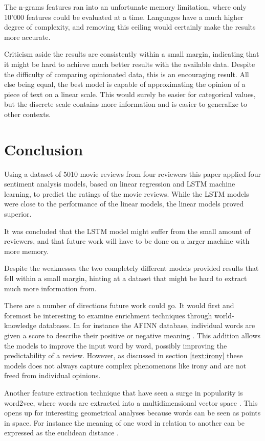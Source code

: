 \documentclass[a4paper]{article}
\begin{document}
The n-grams features ran into an unfortunate memory limitation, where only
10'000 features could be evaluated at a time. Languages have a much higher
degree of complexity, and removing this ceiling would certainly make the results
more accurate.

Criticism aside the results are consistently within a small margin, indicating
that it might be hard to achieve much better results with the available data.
Despite the difficulty of comparing opinionated data, this is an encouraging
result. All else being equal, the best model is capable of approximating
the opinion of a piece of text on a linear scale. This would surely be easier
for categorical values, but the discrete scale contains more information and
is easier to generalize to other contexts.

\section{Conclusion}
Using a dataset of 5010 movie reviews from four reviewers this paper applied
four sentiment analysis models, based on linear regression and LSTM
machine learning, to predict the ratings of the movie reviews.
While the LSTM models were close to the performance of the linear models,
the linear models proved superior.

It was concluded that the LSTM model might suffer from the small amount of
reviewers, and that future work will have to be done on a larger machine with
more memory.

Despite the weaknesses the two completely different models provided results
that fell within a small margin, hinting at a dataset that might be hard to
extract much more information from.

There are a number of directions future work could go. It would first and
foremost be interesting to examine enrichment techniques through world-knowledge
databases. In for instance the AFINN database, individual words are given a
score to describe their positive or negative meaning \citep{IMM2011-06010}.
This addition allows the models to improve the input word by word, possibly
improving the predictability of a review. However, as discussed in section
\ref{text:irony} these models does not always capture complex phenomenons like
irony and are not freed from individual opinions.

Another feature extraction technique that have seen a surge in popularity is
word2vec, where words are extracted into a multidimensional vector space
\citep{Schmidhuber2015}.
This opens up for interesting geometrical analyses because words can be seen as
points in space. For instance the meaning of one word in relation to another
can be expressed as the euclidean distance \citep{Russell2009, Schmidhuber2015}.
\end{document}
